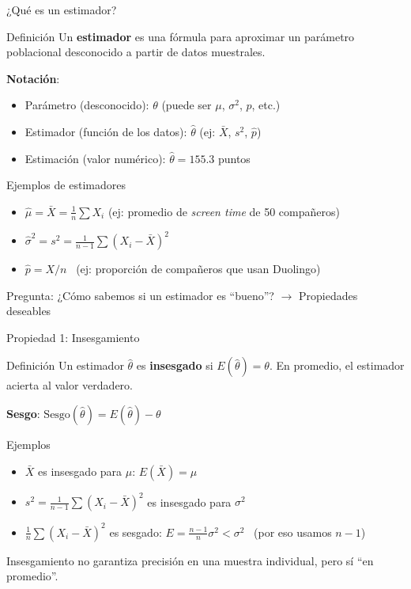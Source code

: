\documentclass[aspectratio=169, 11pt]{beamer}
\begin{document}
\begin{frame}{¿Qué es un estimador?}
\begin{block}{Definición}
Un \textbf{estimador} es una fórmula para aproximar un parámetro poblacional desconocido a partir de datos muestrales.
\end{block}

\textbf{Notación}:
\begin{itemize}
\item Parámetro (desconocido): $\theta$ (puede ser $\mu$, $\sigma^2$, $p$, etc.)
\item Estimador (función de los datos): $\hat{\theta}$ (ej: $\bar{X}$, $s^2$, $\hat{p}$)
\item Estimación (valor numérico): $\hat{\theta} = 155.3$ puntos
\end{itemize}

\begin{exampleblock}{Ejemplos de estimadores}
\begin{itemize}
\item $\hat{\mu} = \bar{X} = \frac{1}{n}\sum X_i$ \quad (ej: promedio de \emph{screen time} de 50 compa\~neros)
\item $\hat{\sigma}^2 = s^2 = \frac{1}{n-1}\sum(X_i - \bar{X})^2$
\item $\hat{p} = X/n$ \ (ej: proporci\'on de compa\~neros que usan Duolingo)
\end{itemize}
\end{exampleblock}

\alert{Pregunta}: ¿Cómo sabemos si un estimador es ``bueno''? $\to$ Propiedades deseables
\end{frame}

\begin{frame}{Propiedad 1: Insesgamiento}
\begin{block}{Definición}
Un estimador $\hat{\theta}$ es \textbf{insesgado} si $E(\hat{\theta}) = \theta$.
En promedio, el estimador acierta al valor verdadero.
\end{block}

\textbf{Sesgo}: $\text{Sesgo}(\hat{\theta}) = E(\hat{\theta}) - \theta$

\begin{exampleblock}{Ejemplos}
\begin{itemize}
\item $\bar{X}$ es insesgado para $\mu$: $E(\bar{X}) = \mu$
\item $s^2 = \frac{1}{n-1}\sum(X_i-\bar{X})^2$ es insesgado para $\sigma^2$
\item $\frac{1}{n}\sum(X_i-\bar{X})^2$ es \alert{sesgado}: $E = \frac{n-1}{n}\sigma^2 < \sigma^2$ \ (por eso usamos $n-1$)
\end{itemize}
\end{exampleblock}

\alert{Insesgamiento no garantiza precisión en una muestra individual, pero sí ``en promedio''.}
\end{frame}
\end{document}
